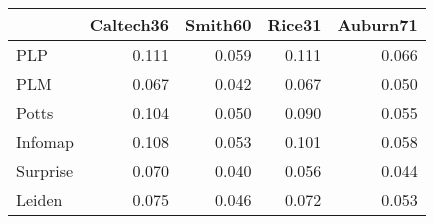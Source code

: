 \begin{tabular}{lrrrr}
\toprule
{} & Caltech36 & Smith60 & Rice31 & Auburn71 \\
\midrule
PLP      &     0.111 &   0.059 &  0.111 &    0.066 \\
PLM      &     0.067 &   0.042 &  0.067 &    0.050 \\
Potts    &     0.104 &   0.050 &  0.090 &    0.055 \\
Infomap  &     0.108 &   0.053 &  0.101 &    0.058 \\
Surprise &     0.070 &   0.040 &  0.056 &    0.044 \\
Leiden   &     0.075 &   0.046 &  0.072 &    0.053 \\
\bottomrule
\end{tabular}
